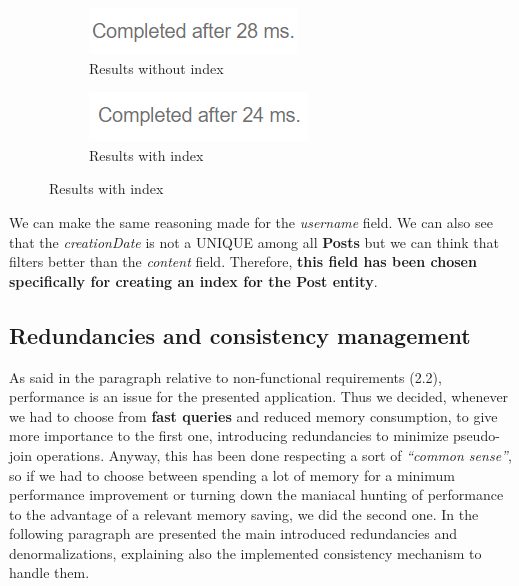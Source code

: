 \begin{figure}[H]
\begin{subfigure}{0.5\textwidth}
	\end{subfigure}
\end{figure}
\begin{figure}[H]
	\begin{subfigure}{0.5\textwidth}
		\includegraphics[width=0.9\linewidth]{img/post_without_index_2.png} 
		\caption{Results without index}
	\end{subfigure}
	\begin{subfigure}{0.5\textwidth}
		\includegraphics[width=0.9\linewidth]{img/post_with_index_2.png}
		\caption{Results with index}
	\end{subfigure}
\end{figure}

We can make the same reasoning made for the \textit{username} field. We can also see that the \textit{creationDate} is not a UNIQUE among all \textbf{Posts} but we can think that filters better than the \textit{content} field. Therefore, \textbf{this field has been chosen specifically for creating an index for the \textbf{Post} entity}.

\subsection{Redundancies and consistency management}
As said in the paragraph relative to non-functional requirements (2.2), performance is an issue for the presented application. Thus we decided, whenever we had to choose from \textbf{fast queries} and reduced memory consumption, to give more importance to the first one, introducing redundancies to minimize pseudo-join operations.
Anyway, this has been done respecting a sort of \textit{“common sense”}, so if we had to choose between spending a lot of memory for a minimum performance improvement or turning down the maniacal hunting of performance to the advantage of a relevant memory saving, we did the second one.  
In the following paragraph are presented the main introduced redundancies and denormalizations, explaining also the implemented consistency mechanism to handle them.


